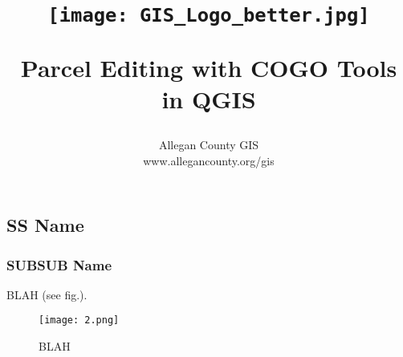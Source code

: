 \documentclass[class=book , crop=false]{standalone}
\title{ %
\HRule %
\\[.4cm] %
\begin{figure}[H] %
\begin{center}	%
	\texttt{[image: GIS\_Logo\_better.jpg]}
	\end{center}
	\end{figure}
	\Huge \bfseries Parcel Editing with COGO Tools in QGIS %
\HRule \\[.4cm] %
}  %
\author{\Large Allegan County GIS \\\Large www.allegancounty.org/gis} %
\begin{document}


\subsection{SS Name}
	\medskip
	\subsubsection{SUBSUB Name}


\clearpage

		\large BLAH (see fig.).
		\begin{figure}[H] %
		\begin{center}
		\texttt{[image: 2.png]}
		\end{center}
		\caption{BLAH}
		\end{figure}
\end{document}
